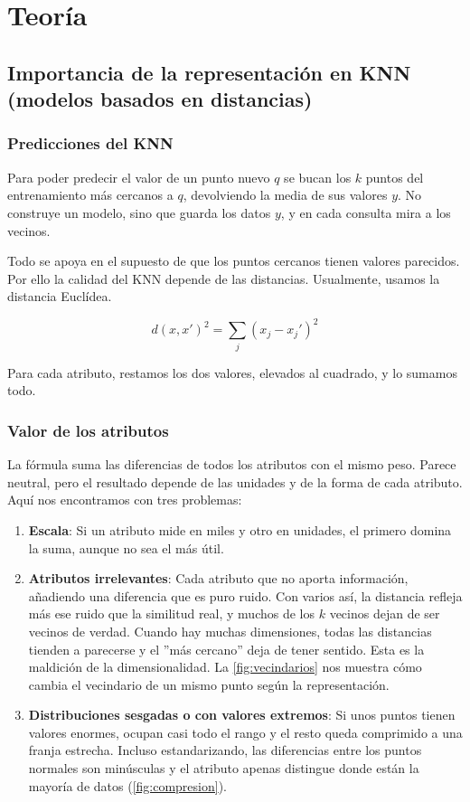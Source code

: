 \section{Teoría}
\subsection{Importancia de la representación en KNN (modelos basados en distancias)}
\subsubsection{Predicciones del KNN}
Para poder predecir el valor de un punto nuevo $q$ se bucan los $k$ puntos del entrenamiento más cercanos a $q$, devolviendo la media de sus valores $y$. No construye un modelo, sino que guarda los datos $y$, y en cada consulta mira a los vecinos. 

Todo se apoya en el supuesto de que los puntos cercanos tienen valores parecidos. Por ello la calidad del KNN depende de las distancias. Usualmente, usamos la distancia Euclídea. 

$$ 
d(x, x')^2 = \sum_{j} (x_{j}-x_{j}')^2
$$

Para cada atributo, restamos los dos valores, elevados al cuadrado, y lo sumamos todo. 

\subsubsection{Valor de los atributos}
La fórmula suma las diferencias de todos los atributos con el mismo peso. Parece neutral, pero el resultado depende de las unidades y de la forma de cada atributo. Aquí nos encontramos con tres problemas: 

\begin{enumerate}
    \item \textbf{Escala}: Si un atributo mide en miles y otro en unidades, el primero domina la suma, aunque no sea el más útil. 
    \item \textbf{Atributos irrelevantes}: Cada atributo que no aporta información, añadiendo una diferencia que es puro ruido. Con varios así, la distancia refleja más ese ruido que la similitud real, y muchos de los $k$ vecinos dejan de ser vecinos de verdad. Cuando hay muchas dimensiones, todas las distancias tienden a parecerse y el ''más cercano'' deja de tener sentido. Esta es la maldición de la dimensionalidad. La \autoref{fig:vecindarios} nos muestra cómo cambia el vecindario de un mismo punto según la representación.
    \item \textbf{Distribuciones sesgadas o con valores extremos}: Si unos puntos tienen valores enormes, ocupan casi todo el rango y el resto queda comprimido a una franja estrecha. Incluso estandarizando, las diferencias entre los puntos normales son minúsculas y el atributo apenas distingue donde están la mayoría de datos (\autoref{fig:compresion}).
\end{enumerate}

